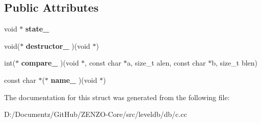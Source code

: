 \subsection*{Public Attributes}
\begin{DoxyCompactItemize}
\item 
\mbox{\label{structleveldb__comparator__t_a720da927befa8098f21437c663d0b0e2}} 
void $\ast$ {\bfseries state\+\_\+}
\item 
\mbox{\label{structleveldb__comparator__t_a757b51457e991ab2219fd5931426bb29}} 
void($\ast$ {\bfseries destructor\+\_\+} )(void $\ast$)
\item 
\mbox{\label{structleveldb__comparator__t_a55906beb72b9f3502c941c16c1187719}} 
int($\ast$ {\bfseries compare\+\_\+} )(void $\ast$, const char $\ast$a, size\+\_\+t alen, const char $\ast$b, size\+\_\+t blen)
\item 
\mbox{\label{structleveldb__comparator__t_a0ed64d60a3e077ed065d745fb6bdee15}} 
const char $\ast$($\ast$ {\bfseries name\+\_\+} )(void $\ast$)
\end{DoxyCompactItemize}


The documentation for this struct was generated from the following file\+:\begin{DoxyCompactItemize}
\item 
D\+:/\+Documentz/\+Git\+Hub/\+Z\+E\+N\+Z\+O-\/\+Core/src/leveldb/db/c.\+cc\end{DoxyCompactItemize}
